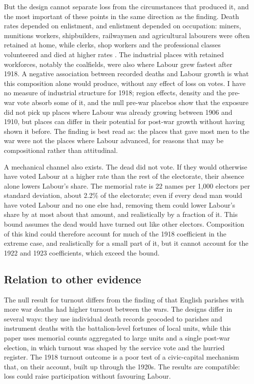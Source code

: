 \documentclass[11pt,a4paper]{article}
\begin{document}
But the design cannot separate loss from the circumstances that produced it, and the most important of these points in the same direction as the finding. Death rates depended on enlistment, and enlistment depended on occupation: miners, munitions workers, shipbuilders, railwaymen and agricultural labourers were often retained at home, while clerks, shop workers and the professional classes volunteered and died at higher rates \citep{winter1977,dewey1984}. The industrial places with retained workforces, notably the coalfields, were also where Labour grew fastest after 1918. A negative association between recorded deaths and Labour growth is what this composition alone would produce, without any effect of loss on votes. I have no measure of industrial structure for 1918; region effects, density and the pre-war vote absorb some of it, and the null pre-war placebos show that the exposure did not pick up places where Labour was already growing between 1906 and 1910, but places can differ in their potential for post-war growth without having shown it before. The finding is best read as: the places that gave most men to the war were not the places where Labour advanced, for reasons that may be compositional rather than attitudinal.

A mechanical channel also exists. The dead did not vote. If they would otherwise have voted Labour at a higher rate than the rest of the electorate, their absence alone lowers Labour's share. The memorial rate is 22 names per 1,000 electors per standard deviation, about 2.2\% of the electorate; even if every dead man would have voted Labour and no one else had, removing them could lower Labour's share by at most about that amount, and realistically by a fraction of it. This bound assumes the dead would have turned out like other electors. Composition of this kind could therefore account for much of the 1918 coefficient in the extreme case, and realistically for a small part of it, but it cannot account for the 1922 and 1923 coefficients, which exceed the bound.

\subsection{Relation to other evidence}
The null result for turnout differs from the finding of \citet{carozzi2023} that English parishes with more war deaths had higher turnout between the wars. The designs differ in several ways: they use individual death records geocoded to parishes and instrument deaths with the battalion-level fortunes of local units, while this paper uses memorial counts aggregated to large units and a single post-war election, in which turnout was shaped by the service vote and the hurried register. The 1918 turnout outcome is a poor test of a civic-capital mechanism that, on their account, built up through the 1920s. The results are compatible: loss could raise participation without favouring Labour.
\end{document}

